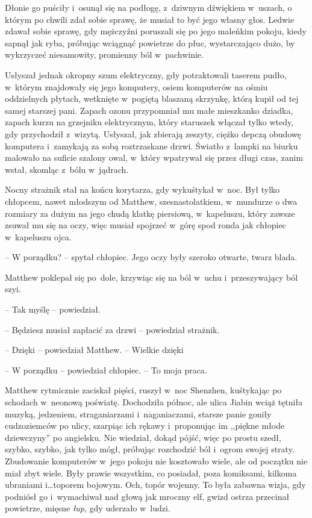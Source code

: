 \documentclass[oneside,polish,11pt,rmheadings]{mwbk}
\begin{document}
Dłonie go puściły i~osunął się na podłogę, z~dziwnym dźwiękiem w~uszach, o którym po chwili zdał sobie sprawę, że musiał to być jego własny głos. Ledwie zdawał sobie sprawę, gdy mężczyźni poruszali się po jego maleńkim pokoju, kiedy sapnął jak ryba, próbując wciągnąć powietrze do płuc, wystarczająco dużo, by wykrzyczeć niesamowity, promienny ból w~pachwinie. 


Usłyszał jednak okropny szum elektryczny, gdy potraktowali taserem pudło, w~którym znajdowały się jego komputery, osiem komputerów na ośmiu oddzielnych płytach, wetknięte w~pogiętą blaszaną skrzynkę, którą kupił od tej samej starszej pani. Zapach ozonu przypomniał mu małe mieszkanko dziadka, zapach kurzu na grzejniku elektrycznym, który staruszek włączał tylko wtedy, gdy przychodził z~wizytą. Usłyszał, jak zbierają zeszyty, ciężko depczą obudowę komputera i~zamykają za sobą roztrzaskane drzwi. Światło z~lampki na biurku malowało na suficie szalony owal, w~który wpatrywał się przez długi czas, zanim wstał, skomląc z~bólu w~jądrach. 


Nocny strażnik stał na końcu korytarza, gdy wykuśtykał w~noc. Był tylko chłopcem, nawet młodszym od Matthew, szesnastolatkiem, w~mundurze o dwa rozmiary za dużym na jego chudą klatkę piersiową, w~kapeluszu, który zawsze zsuwał mu się na oczy, więc musiał spojrzeć w~górę spod ronda jak chłopiec w~kapeluszu ojca. 


-- W porządku? -- spytał chłopiec. Jego oczy były szeroko otwarte, twarz blada. 

Matthew poklepał się po~dole, krzywiąc się na ból w~uchu i~przeszywający ból szyi. 


-- Tak myślę -- powiedział. 


-- Będziesz musiał zapłacić za drzwi -- powiedział strażnik. 


-- Dzięki -- powiedział Matthew. -- Wielkie dzięki 


-- W porządku -- powiedział chłopiec. -- To moja praca. 


Matthew rytmicznie zaciskał pięści, ruszył w~noc Shenzhen, kuśtykając po schodach w~neonową poświatę. Dochodziła północ, ale ulica Jiabin wciąż tętniła muzyką, jedzeniem, straganiarzami i~naganiaczami, starsze panie goniły cudzoziemców po ulicy, szarpiąc ich rękawy i~proponując im ,,piękne młode dziewczyny'' po angielsku. Nie wiedział, dokąd pójść, więc po prostu szedł, szybko, szybko, jak tylko mógł, próbując rozchodzić ból i~ogrom swojej straty. Zbudowanie komputerów w~jego pokoju nie kosztowało wiele, ale od początku nie miał zbyt wiele. Były prawie wszystkim, co posiadał, poza komiksami, kilkoma ubraniami i\ldots  toporem bojowym. Och, topór wojenny. To była zabawna wizja, gdy podniósł go i~wymachiwał nad głową jak mroczny elf, gwizd ostrza przecinał powietrze, mięsne \textit{łup}, gdy uderzało w~ludzi. 
\end{document}
